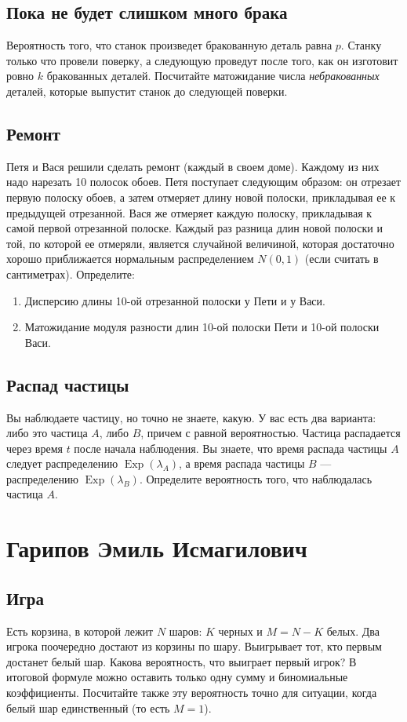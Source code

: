 \documentclass[12pt]{article}
\DeclareMathOperator{\Exp}{Exp}
\begin{document}
\subsection{Пока не будет слишком много брака}
Вероятность того, что станок произведет бракованную деталь равна $p$. Станку только что провели поверку, а следующую проведут после того, как он изготовит ровно $k$ бракованных деталей. Посчитайте матожидание числа \emph{небракованных} деталей, которые выпустит станок до следующей поверки.

\subsection{Ремонт}
Петя и Вася решили сделать ремонт (каждый в своем доме). Каждому из них надо нарезать 10 полосок обоев. Петя поступает следующим образом: он отрезает первую полоску обоев, а затем отмеряет длину новой полоски, прикладывая ее к предыдущей отрезанной. Вася же отмеряет каждую полоску, прикладывая к самой первой отрезанной полоске. Каждый раз разница длин новой полоски и той, по которой ее отмеряли, является случайной величиной, которая достаточно хорошо приближается нормальным распределением $N(0, 1)$ (если считать в сантиметрах). Определите:
\begin{enumerate}
    \item Дисперсию длины 10-ой отрезанной полоски у Пети и у Васи.
    \item Матожидание модуля разности длин 10-ой полоски Пети и 10-ой полоски Васи. 
\end{enumerate}

\subsection{Распад частицы}
Вы наблюдаете частицу, но точно не знаете, какую. У вас есть два варианта: либо это частица $A$, либо $B$, причем с равной вероятностью. Частица распадается через время $t$ после начала наблюдения. Вы знаете, что время распада частицы $A$ следует распределению $\Exp(\lambda_A)$, а время распада частицы $B$ --- распределению $\Exp(\lambda_B)$. Определите вероятность того, что наблюдалась частица $A$.

\newpage
\section{Гарипов Эмиль Исмагилович}

\subsection{Игра}
Есть корзина, в которой лежит $N$ шаров: $K$ черных и $M = N - K$ белых. Два игрока поочередно достают из корзины по шару. Выигрывает тот, кто первым достанет белый шар. Какова вероятность, что выиграет первый игрок? В итоговой формуле можно оставить только одну сумму и биномиальные коэффициенты. Посчитайте также эту вероятность точно для ситуации, когда белый шар единственный (то есть $M = 1$).
\end{document}
